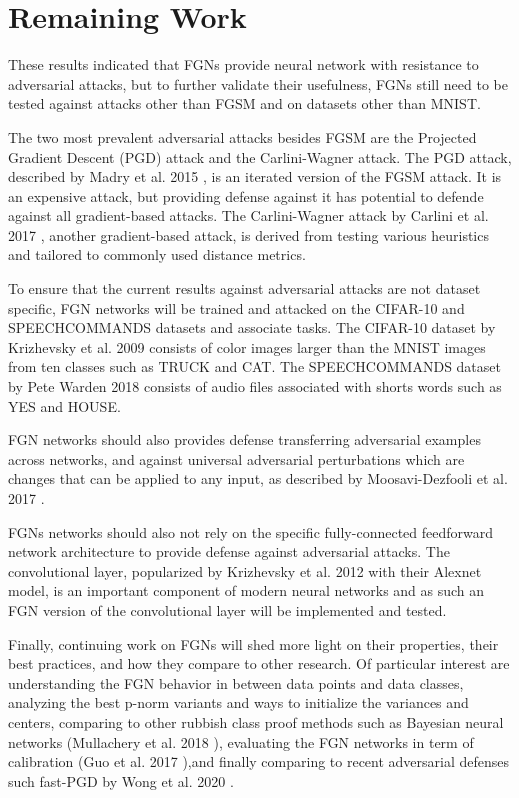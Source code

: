 \documentclass[12pt,oneside]{CUNY_PhD}
\begin{document}
\chapter{Remaining Work}
These results indicated that FGNs provide neural network with resistance to adversarial attacks, but to further validate their usefulness, FGNs still need to be tested against attacks other than FGSM and on datasets other than MNIST.

The two most prevalent adversarial attacks besides FGSM are the Projected Gradient Descent (PGD) attack and the Carlini-Wagner attack. The PGD attack, described by Madry et al. 2015 \cite{madry2019deep}, is an iterated version of the FGSM attack. It is an expensive attack, but providing defense against it has potential to defende against all gradient-based attacks. The Carlini-Wagner attack by Carlini et al. 2017 \cite{carlini2017evaluating}, another gradient-based attack, is derived from testing various heuristics and tailored to commonly used distance metrics. 

To ensure that the current results against adversarial attacks are not dataset specific, FGN networks will be trained and attacked on the CIFAR-10 and SPEECHCOMMANDS datasets and associate tasks. The CIFAR-10 dataset by Krizhevsky et al. 2009 \cite{Krizhevsky2009LearningML} consists of color images larger than the MNIST images from ten classes such as TRUCK and CAT. The SPEECHCOMMANDS dataset by Pete Warden 2018 \cite{DBLP:journals/corr/abs-1804-03209} consists of audio files associated with shorts words such as YES and HOUSE. 

FGN networks should also provides defense transferring adversarial examples across networks, and against universal adversarial perturbations which are changes that can be applied to any input, as described by Moosavi-Dezfooli et al. 2017 \cite{moosavidezfooli2017universal}.

FGNs networks should also not rely on the specific fully-connected feedforward network architecture to provide defense against adversarial attacks. The convolutional layer, popularized by Krizhevsky et al. 2012 \cite{krizhevsky2012imagenet} with their Alexnet model, is an important component of modern neural networks and as such an FGN version of the convolutional layer will be implemented and tested.

Finally, continuing work on FGNs will shed more light on their properties, their best practices, and how they compare to other research. Of particular interest are understanding the FGN behavior in between data points and data classes, analyzing the best p-norm variants and ways to initialize the variances and centers, comparing to other rubbish class proof methods such as Bayesian neural networks (Mullachery et al. 2018 \cite{mullachery2018bayesian}), evaluating the FGN networks in term of calibration (Guo et al. 2017 \cite{guo2017calibration}),and finally comparing to recent adversarial defenses such fast-PGD by Wong et al. 2020 \cite{wong2020fast}.
\end{document}
